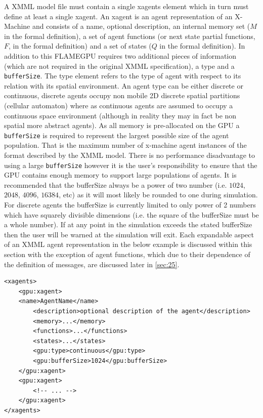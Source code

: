 \documentclass[11pt, a4paper, onecolumn, oneside]{report}
\begin{document}
A XMML model file must contain a single xagents element which in turn must define at least a single xagent.
An xagent is an agent representation of an X-Machine and consists of a name, optional description, an internal memory set ($M$ in the formal definition), a set of agent functions (or next state partial functions, $F$, in the formal definition) and a set of states ($Q$ in the formal definition).
In addition to this FLAMEGPU requires two additional pieces of information (which are not required in the original XMML specification), a type and a \texttt{bufferSize}.
The type element refers to the type of agent with respect to its relation with its spatial environment.
An agent type can be either discrete or continuous, discrete agents occupy non mobile 2D discrete spatial partitions (cellular automaton) where as continuous agents are assumed to occupy a continuous space environment (although in reality they may in fact be non spatial more abstract agents).
As all memory is pre-allocated on the GPU a \texttt{bufferSize} is required to represent the largest possible size of the agent population.
That is the maximum number of x-machine agent instances of the format described by the XMML model.
There is no performance disadvantage to using a large \texttt{bufferSize} however it is the user's responsibility to ensure that the GPU contains enough memory to support large populations of agents.
It is recommended that the bufferSize always be a power of two number (i.e.
$1024$, $2048$, $4096$, $16384$, etc) as it will most likely be rounded to one during simulation.
For discrete agents the bufferSize is currently limited to only power of 2 numbers which have squarely divisible dimensions (i.e. the square of the bufferSize must be a whole number).
If at any point in the simulation exceeds the stated bufferSize then the user will be warned at the simulation will exit.
Each expandable aspect of an XMML agent representation in the below example is discussed within this section with the exception of agent functions, which due to their dependence of the definition of messages, are discussed later in \cref{sec:25}.

\begin{verbatim}
<xagents>
    <gpu:xagent>
    <name>AgentName</name>
        <description>optional description of the agent</description>
        <memory>...</memory>
        <functions>...</functions>
        <states>...</states>
        <gpu:type>continuous</gpu:type>
        <gpu:bufferSize>1024</gpu:bufferSize>
    </gpu:xagent>
    <gpu:xagent>
        <!-- ... -->
    </gpu:xagent>
</xagents>
\end{verbatim}
\end{document}
